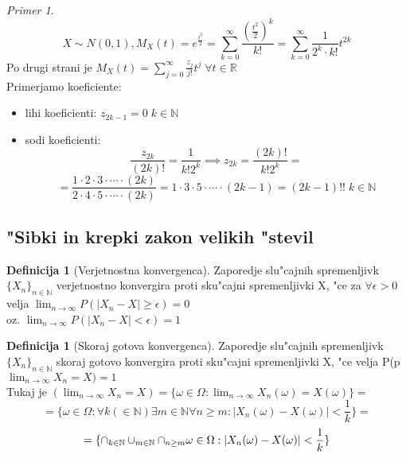\documentclass[a4paper,12pt]{article}
\theoremstyle{definition}
\newtheorem{defn}[counter]{Definicija}
\theoremstyle{remark}
\newtheorem*{ex}{Primer}
\newcommand{\N}{\mathbb{N}}
\newcommand{\R}{\mathbb{R}}
\begin{document}
\begin{ex}
    \[X \sim N(0,1), M_X(t) = e^{\frac{t^2}{2}} = \sum_{k=0}^{\infty} \frac{(\frac{t^2}{2})^k}{k!} =
    \sum_{k=0}^{\infty} \frac{1}{2^k \cdot k!} t^{2k}\]
    Po drugi strani je $M_X(t) = \sum_{j=0}^{\infty} \frac{z_j}{j!} t^j \; \forall t \in \R$ \\
    Primerjamo koeficiente:
    \begin{itemize}
        \item lihi koeficienti: $z_{2k-1} = 0 \; k \in \N$
        \item sodi koeficienti:
        \[\frac{z_{2k}}{(2k)!} = \frac{1}{k! 2^k} \implies z_{2k} = \frac{(2k)!}{k! 2^k} =\]
        \[= \frac{1 \cdot 2 \cdot 3 \cdot \cdots \cdot (2k)}{2 \cdot 4 \cdot 5 \cdot \cdots \cdot (2k)} =
        1 \cdot 3 \cdot 5 \cdot \cdots \cdot (2k-1) = (2k-1)!! \; k \in \N\]
    \end{itemize}
\end{ex}

\subsection{"Sibki in krepki zakon velikih "stevil}

\begin{defn}[Verjetnostna konvergenca]
    Zaporedje slu"cajnih spremenljivk $\{X_n\}_{n \in \N}$ verjetnostno konvergira proti sku"cajni spremenljivki
    X, "ce za $\forall \epsilon > 0$ velja $\lim_{n \to \infty} P(|X_n-X| \geq \epsilon) = 0$ \\
    oz. $\lim_{n \to \infty} P(|X_n-X| < \epsilon) = 1$
\end{defn}

\begin{defn}[Skoraj gotova konvergenca]     %
    Zaporedje slu"cajnih spremenljivk $\{X_n\}_{n \in \N}$ skoraj gotovo konvergira proti sku"cajni spremenljivki
    X, "ce velja P(p $\lim_{n \to \infty} X_n = X) = 1$ \\
    Tukaj je $(\lim_{n \to \infty} X_n = X) = \{\omega \in \Omega: \lim_{n \to \infty} X_n(\omega) = X(\omega)\} =$
    \[= \{\omega \in \Omega: \forall k (\in \N) \exists m \in \N \forall n \geq m: |X_n(\omega) - X(\omega)| < \frac{1}{k}\} =\]
    \begin{align}
        = \{\cap_{k \in \N} \cup_{m \in \N} \cap_{n \geq m} \omega \in \Omega: |X_n(\omega) - X(\omega)| < \frac{1}{k}\} \*
    \end{align}
\end{defn}
\end{document}
